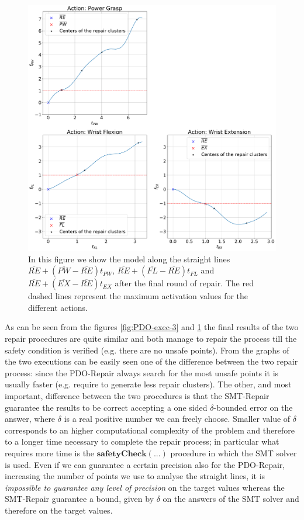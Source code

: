 \begin{figure}[H]
    \centering
    \includegraphics[width=\textwidth]{Images/repair-example/SMT-State4.pdf}
    \caption{In this figure we show the model along the straight lines $\overline{RE} + (\overline{PW} - \overline{RE})t_{PW}$, $\overline{RE} + (\overline{FL} - \overline{RE})t_{FL}$ and $\overline{RE} + (\overline{EX} - \overline{RE})t_{EX}$ after the final round of repair. The red dashed lines represent the maximum activation values for the different actions.}
    \label{fig:SMT-exec-4}
\end{figure}
As can be seen from the figures \ref{fig:PDO-exec-3} and \ref{fig:SMT-exec-4} the final results of the two repair procedures are quite similar and both manage to repair the process till the safety condition is verified (e.g. there are no unsafe points). From the graphs of the two executions can be easily seen one of the difference between the two repair process: since the PDO-Repair always search for the most unsafe points it is usually faster (e.g. require to generate less repair clusters). The other, and most important, difference between the two procedures is that the SMT-Repair guarantee the results to be correct accepting a one sided $\delta$-bounded error on the answer, where $\delta$ is a real positive number we can freely choose. Smaller value of $\delta$ corresponds to an higher computational complexity of the problem and therefore to a longer time necessary to complete the repair process; in particular what requires more time is the $\mathbf{safetyCheck(...)}$ procedure in which the SMT solver is used.
Even if we can guarantee a certain precision also for the PDO-Repair, increasing the number of points we use to analyse the straight lines, it is \textit{impossible to guarantee any level of precision} on the target values whereas the SMT-Repair guarantee a bound, given by $\delta$ on the answers of the SMT solver and therefore on the target values.
